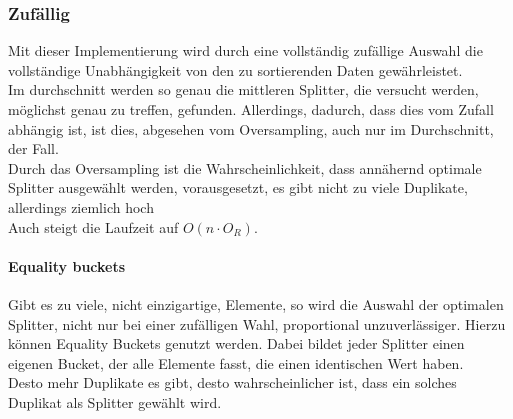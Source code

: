 		\subsubsection{Zufällig}
			\label{sec:random}
			
			Mit dieser Implementierung wird durch eine vollständig zufällige Auswahl die vollständige Unabhängigkeit von den zu sortierenden Daten gewährleistet.\\
			Im durchschnitt werden so genau die mittleren Splitter, die versucht werden, möglichst genau zu treffen, gefunden.
			Allerdings, dadurch, dass dies vom Zufall abhängig ist, ist dies, abgesehen vom Oversampling, auch nur im Durchschnitt, der Fall.\\
			Durch das Oversampling ist die Wahrscheinlichkeit, dass annähernd optimale Splitter ausgewählt werden, vorausgesetzt, es gibt nicht zu viele Duplikate, allerdings ziemlich hoch\\%
			Auch steigt die Laufzeit auf $O(n\cdot O_R)$.\\

			\paragraph{Equality buckets}
				Gibt es zu viele, nicht einzigartige, Elemente, so wird die Auswahl der optimalen Splitter, nicht nur bei einer zufälligen Wahl, proportional unzuverlässiger.
				Hierzu können Equality Buckets genutzt werden.
				Dabei bildet jeder Splitter einen eigenen Bucket, der alle Elemente fasst, die einen identischen Wert haben.\\
				Desto mehr Duplikate es gibt, desto wahrscheinlicher ist, dass ein solches Duplikat als Splitter gewählt wird.

